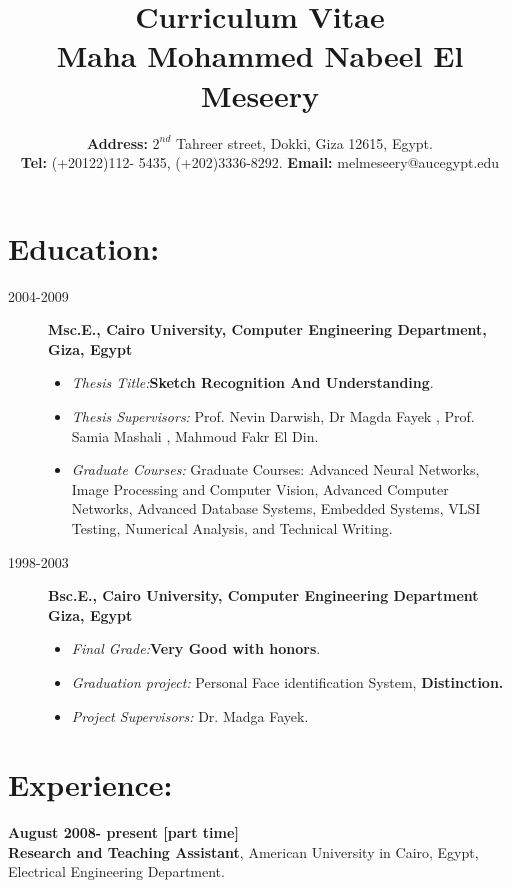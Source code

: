 \documentclass{article}
\title {Curriculum Vitae \\ \LARGE Maha Mohammed Nabeel El Meseery }
\date{\textbf{ Address:} $2^{nd}$ Tahreer street, Dokki, Giza 12615,
Egypt. \\ \textbf{Tel:} (+20122)112- 5435, (+202)3336-8292.
\textbf{Email:} melmeseery@aucegypt.edu}
\begin{document}
\maketitle

\hline 
\hline 
 \section*{Education:}
  \begin{description}
\item [2004-2009]  \textbf{Msc.E., Cairo University, Computer Engineering Department, Giza, Egypt}
  \begin{itemize}
    \item \textit{ Thesis Title:}\textbf{Sketch Recognition And Understanding}.
    \item \textit{Thesis Supervisors:} Prof. Nevin Darwish, Dr Magda Fayek , Prof. Samia
 Mashali , Mahmoud Fakr El Din.
  \item \textit{ Graduate Courses:} Graduate Courses: Advanced Neural Networks, Image
  Processing and Computer Vision, Advanced Computer Networks, Advanced Database Systems, Embedded Systems, VLSI Testing, Numerical Analysis, and Technical Writing.

\end{itemize}

 \item[1998-2003]  \textbf{ Bsc.E., Cairo University, Computer Engineering Department Giza, Egypt}
   \begin{itemize}
    \item \textit{Final Grade:}\textbf{Very Good with honors}.
  \item \textit{Graduation project:} Personal Face identification System, \textbf{Distinction.}
  \item \textit{Project Supervisors:} Dr. Madga Fayek.
\end{itemize}
  \end{description}

 \section*{Experience:}
 \textbf{August 2008- present [part time]}\\
 \textbf{Research and Teaching Assistant}, American University in Cairo, Egypt,
 Electrical Engineering Department.
\end{document}
